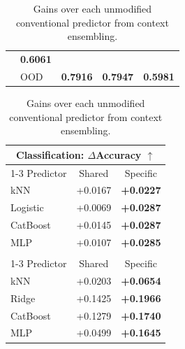 \begin{table}[H]
\begin{minipage}[t]{0.61\textwidth}
\begin{tabular}{@{}llccc@{}}
        & \textcolor{specificred}{\textbf{0.6061}} \\
           & OOD
        & \textcolor{specificred}{\textbf{0.7916}}
        & \textcolor{specificred}{\textbf{0.7947}}
        & \textcolor{specificred}{\textbf{0.5981}} \\
      \bottomrule
    \end{tabular}
  \end{minipage}\hfill
  \begin{minipage}[t]{0.36\textwidth}
    \vspace{0pt}
    \centering
    \caption{Gains over each unmodified conventional predictor from context ensembling.}
    \label{tab:traditional-backbone-gains}
    \small
    \setlength{\tabcolsep}{4.0pt}
    \renewcommand{\arraystretch}{1.02}
    \begin{tabular}{@{}lcc@{}}
      \toprule
      \multicolumn{3}{c}{Classification: $\Delta$Accuracy $\uparrow$} \\
      \cmidrule(lr){1-3}
      Predictor & Shared & Specific \\
      \midrule
      kNN & \textcolor{sharedblue}{+0.0167}
        & \textcolor{specificred}{\textbf{+0.0227}} \\
      Logistic & \textcolor{sharedblue}{+0.0069}
        & \textcolor{specificred}{\textbf{+0.0287}} \\
      CatBoost & \textcolor{sharedblue}{+0.0145}
        & \textcolor{specificred}{\textbf{+0.0287}} \\
      MLP & \textcolor{sharedblue}{+0.0107}
        & \textcolor{specificred}{\textbf{+0.0285}} \\
      \addlinespace[5pt]
      \multicolumn{3}{c}{Regression: $\Delta R^2$ $\uparrow$} \\
      \cmidrule(lr){1-3}
      Predictor & Shared & Specific \\
      \midrule
      kNN & \textcolor{sharedblue}{+0.0203}
        & \textcolor{specificred}{\textbf{+0.0654}} \\
      Ridge & \textcolor{sharedblue}{+0.1425}
        & \textcolor{specificred}{\textbf{+0.1966}} \\
      CatBoost & \textcolor{sharedblue}{+0.1279}
        & \textcolor{specificred}{\textbf{+0.1740}} \\
      MLP & \textcolor{sharedblue}{+0.0499}
        & \textcolor{specificred}{\textbf{+0.1645}} \\
      \bottomrule
    \end{tabular}
  \end{minipage}
\end{table}
